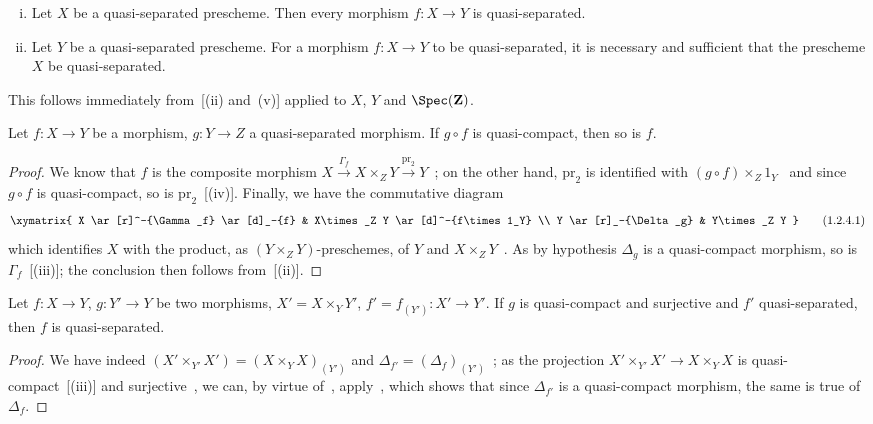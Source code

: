\begin{corollary}[1.2.3]
\label{IV.1.2.3}
\medskip\noindent
\begin{enumerate}[(i)]
  \item Let $X$ be a quasi-separated prescheme. Then every morphism $f:X\to Y$
    is quasi-separated.
  \item Let $Y$ be a quasi-separated prescheme. For a morphism $f:X\to Y$ to be quasi-separated,
    it is necessary and sufficient that the prescheme $X$ be quasi-separated.
\end{enumerate}
\end{corollary}

This follows immediately from~[(ii) and~(v)] applied to $X$, $Y$ and $\Spec(\mathbf{Z})$.

\begin{proposition}[1.2.4]
\label{IV.1.2.4}
Let $f:X\to Y$ be a morphism, $g:Y\to Z$ a quasi-separated morphism.
If $g\circ f$ is quasi-compact, then so is $f$.
\end{proposition}

\begin{proof}
We know that $f$ is the composite morphism $X\xrightarrow{\Gamma_f} X\times_Z Y\xrightarrow{\mathrm{pr}_2} Y$~; on the other hand,
$\mathrm{pr}_2$ is identified with $(g\circ f)\times_Z 1_Y$~ and since $g\circ f$ is quasi-compact, so is
$\mathrm{pr}_2$~[(iv)]. Finally, we have the commutative diagram
\[
\xymatrix{
  X \ar[r]^-{\Gamma_f} \ar[d]_-{f} & X\times_Z Y \ar[d]^-{f\times 1_Y} \\
  Y \ar[r]_-{\Delta_g} & Y\times_Z Y
}
\label{IV.1.2.4.1}
\tag{1.2.4.1}
\]
which identifies $X$ with the product, as $(Y\times_Z Y)$-preschemes, of $Y$ and
$X\times_Z Y$~. As
by hypothesis $\Delta_g$ is a quasi-compact morphism, so is $\Gamma_f$~[(iii)];
the conclusion then follows from~[(ii)].
\end{proof}

\begin{proposition}[1.2.5]
\label{IV.1.2.5}
Let $f:X\to Y$, $g:Y'\to Y$ be two morphisms, $X'=X\times_Y Y'$,
$f'=f_{(Y')}:X'\to Y'$. If $g$ is quasi-compact and surjective and $f'$ quasi-separated, then $f$ is
quasi-separated.
\end{proposition}

\begin{proof}
We have indeed $(X'\times_{Y'} X')=(X\times_Y X)_{(Y')}$ and $\Delta_{f'}=(\Delta_f)_{(Y')}$~; as the
projection $X'\times_{Y'} X'\to X\times_Y X$ is quasi-compact~[(iii)] and surjective~,
we can, by virtue of~, apply~, which shows that since $\Delta_{f'}$ is
a quasi-compact morphism, the same is true of $\Delta_f$.
\end{proof}

